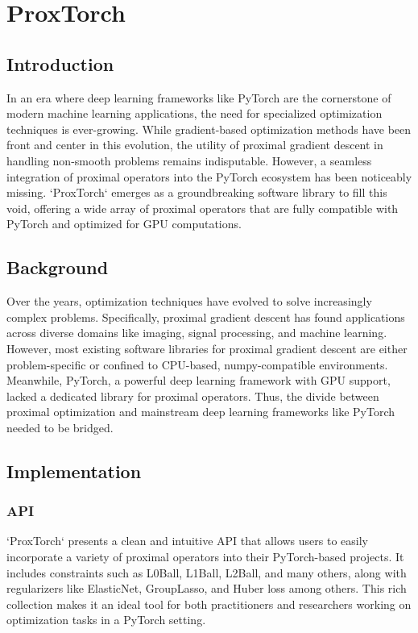 \section{ProxTorch}\label{sec:proxtorch}

\subsection{Introduction}

In an era where deep learning frameworks like PyTorch are the cornerstone of modern machine learning applications, the need for specialized optimization techniques is ever-growing.
While gradient-based optimization methods have been front and center in this evolution, the utility of proximal gradient descent in handling non-smooth problems remains indisputable.
However, a seamless integration of proximal operators into the PyTorch ecosystem has been noticeably missing.
`ProxTorch` emerges as a groundbreaking software library to fill this void, offering a wide array of proximal operators that are fully compatible with PyTorch and optimized for GPU computations.

\subsection{Background}

Over the years, optimization techniques have evolved to solve increasingly complex problems.
Specifically, proximal gradient descent has found applications across diverse domains like imaging, signal processing, and machine learning.
However, most existing software libraries for proximal gradient descent are either problem-specific or confined to CPU-based, numpy-compatible environments.
Meanwhile, PyTorch, a powerful deep learning framework with GPU support, lacked a dedicated library for proximal operators.
Thus, the divide between proximal optimization and mainstream deep learning frameworks like PyTorch needed to be bridged.

\subsection{Implementation}

\subsubsection{API}

`ProxTorch` presents a clean and intuitive API that allows users to easily incorporate a variety of proximal operators into their PyTorch-based projects.
It includes constraints such as L0Ball, L1Ball, L2Ball, and many others, along with regularizers like ElasticNet, GroupLasso, and Huber loss among others.
This rich collection makes it an ideal tool for both practitioners and researchers working on optimization tasks in a PyTorch setting.

